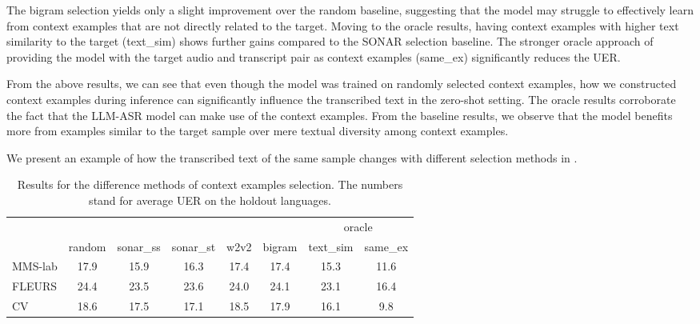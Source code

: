 \documentclass[]{fairmeta}
\begin{document}
The bigram selection yields only a slight improvement over the random baseline, suggesting that the model may struggle to effectively learn from context examples that are not directly related to the target. Moving to the oracle results, having context examples with higher text similarity to the target (text\_sim) shows further gains compared to the SONAR selection baseline. The stronger oracle approach of providing the model with the target audio and transcript pair as context examples (same\_ex) significantly reduces the UER.

From the above results, we can see that even though the model was trained on randomly selected context examples, how we constructed context examples during inference can significantly influence the transcribed text in the zero-shot setting. The oracle results corroborate the fact that the LLM-ASR model can make use of the context examples. From the baseline results, we observe that the model benefits more from examples similar to the target sample over mere textual diversity among context examples.

We present an example of how the transcribed text of the same sample changes with different selection methods in . 

\begin{table}[!ht]
    \centering
    \begin{tabular}{lccccccc}
    \toprule
    & & & & & & \multicolumn{2}{c}{oracle}  \\
    \cline{7-8}
    & random & sonar\_ss & sonar\_st & w2v2 & bigram & text\_sim & same\_ex \\
    \hline
    MMS-lab & 17.9 & 15.9 & 16.3 & 17.4 & 17.4 & 15.3 & 11.6 \\
    FLEURS & 24.4 & 23.5 & 23.6 & 24.0 & 24.1 & 23.1 & 16.4 \\
    CV & 18.6 & 17.5 & 17.1 & 18.5 & 17.9 & 16.1 & 9.8 \\
    \bottomrule
    \end{tabular}
    \caption{Results for the difference methods of context examples selection. The numbers stand for average UER on the holdout languages.}
    \label{tab:selection-avg}
\end{table}
\end{document}
